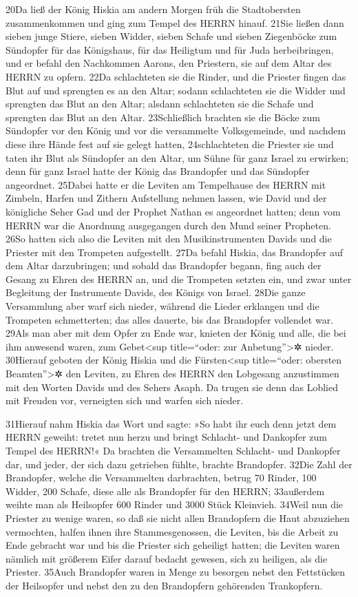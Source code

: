20Da ließ der König Hiskia am andern Morgen früh die Stadtobersten
zusammenkommen und ging zum Tempel des HERRN hinauf. 21Sie ließen dann
sieben junge Stiere, sieben Widder, sieben Schafe und sieben Ziegenböcke
zum Sündopfer für das Königshaus, für das Heiligtum und für Juda
herbeibringen, und er befahl den Nachkommen Aarons, den Priestern, sie
auf dem Altar des HERRN zu opfern. 22Da schlachteten sie die Rinder, und
die Priester fingen das Blut auf und sprengten es an den Altar; sodann
schlachteten sie die Widder und sprengten das Blut an den Altar; alsdann
schlachteten sie die Schafe und sprengten das Blut an den Altar.
23Schließlich brachten sie die Böcke zum Sündopfer vor den König und vor
die versammelte Volksgemeinde, und nachdem diese ihre Hände fest auf sie
gelegt hatten, 24schlachteten die Priester sie und taten ihr Blut als
Sündopfer an den Altar, um Sühne für ganz Israel zu erwirken; denn für
ganz Israel hatte der König das Brandopfer und das Sündopfer angeordnet.
25Dabei hatte er die Leviten am Tempelhause des HERRN mit Zimbeln,
Harfen und Zithern Aufstellung nehmen lassen, wie David und der
königliche Seher Gad und der Prophet Nathan es angeordnet hatten; denn
vom HERRN war die Anordnung ausgegangen durch den Mund seiner Propheten.
26So hatten sich also die Leviten mit den Musikinstrumenten Davids und
die Priester mit den Trompeten aufgestellt. 27Da befahl Hiskia, das
Brandopfer auf dem Altar darzubringen; und sobald das Brandopfer begann,
fing auch der Gesang zu Ehren des HERRN an, und die Trompeten setzten
ein, und zwar unter Begleitung der Instrumente Davids, des Königs von
Israel. 28Die ganze Versammlung aber warf sich nieder, während die
Lieder erklangen und die Trompeten schmetterten; das alles dauerte, bis
das Brandopfer vollendet war. 29Als man aber mit dem Opfer zu Ende war,
knieten der König und alle, die bei ihm anwesend waren, zum
Gebet\textless sup title=``oder: zur Anbetung''\textgreater✲ nieder.
30Hierauf geboten der König Hiskia und die Fürsten\textless sup
title=``oder: obersten Beamten''\textgreater✲ den Leviten, zu Ehren des
HERRN den Lobgesang anzustimmen mit den Worten Davids und des Sehers
Asaph. Da trugen sie denn das Loblied mit Freuden vor, verneigten sich
und warfen sich nieder.

31Hierauf nahm Hiskia das Wort und sagte: »So habt ihr euch denn jetzt
dem HERRN geweiht: tretet nun herzu und bringt Schlacht- und Dankopfer
zum Tempel des HERRN!« Da brachten die Versammelten Schlacht- und
Dankopfer dar, und jeder, der sich dazu getrieben fühlte, brachte
Brandopfer. 32Die Zahl der Brandopfer, welche die Versammelten
darbrachten, betrug 70 Rinder, 100 Widder, 200 Schafe, diese alle als
Brandopfer für den HERRN; 33außerdem weihte man als Heilsopfer 600
Rinder und 3000 Stück Kleinvieh. 34Weil nun die Priester zu wenige
waren, so daß sie nicht allen Brandopfern die Haut abzuziehen
vermochten, halfen ihnen ihre Stammesgenossen, die Leviten, bis die
Arbeit zu Ende gebracht war und bis die Priester sich geheiligt hatten;
die Leviten waren nämlich mit größerem Eifer darauf bedacht gewesen,
sich zu heiligen, als die Priester. 35Auch Brandopfer waren in Menge zu
besorgen nebst den Fettstücken der Heilsopfer und nebst den zu den
Brandopfern gehörenden Trankopfern.

